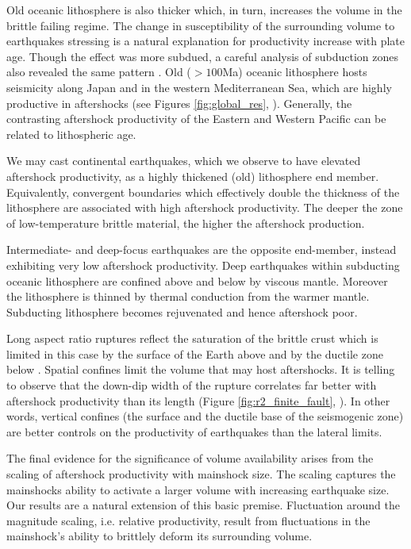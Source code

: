 \documentclass[draft, jgrga]{agujournal2018}
\begin{document}
Old oceanic lithosphere is also thicker which, in turn, increases the volume in the brittle failing regime. The change in susceptibility of the surrounding volume to earthquakes stressing is a natural explanation for productivity increase with plate age. Though the effect was more subdued, a careful analysis of subduction zones also revealed the same pattern \citep[Appendix of][]{Wetzler2016}. Old ($>100$Ma) oceanic lithosphere hosts seismicity along Japan and in the western Mediterranean Sea, which are highly productive in aftershocks (see Figures \ref{fig:global_res}, ). Generally, the contrasting aftershock productivity of the Eastern and Western Pacific can be related to lithospheric age. 

We may cast continental earthquakes, which we observe to have elevated aftershock productivity, as a highly thickened (old) lithosphere end member. Equivalently, convergent boundaries which effectively double the thickness of the lithosphere are associated with high aftershock productivity. The deeper the zone of low-temperature brittle material, the higher the aftershock production.

Intermediate- and deep-focus earthquakes are the opposite end-member, instead exhibiting very low aftershock productivity. Deep earthquakes within subducting oceanic lithosphere are confined above and below by viscous mantle. Moreover the lithosphere is thinned by thermal conduction from the warmer mantle. Subducting lithosphere becomes rejuvenated and hence aftershock poor.

Long aspect ratio ruptures reflect the saturation of the brittle crust which is limited in this case by the surface of the Earth above and by the ductile zone below \citep{Scholz2019}. Spatial confines limit the volume that may host aftershocks. It is telling to observe that the down-dip width of the rupture correlates far better with aftershock productivity than its length (Figure \ref{fig:r2_finite_fault}, ). In other words, vertical confines (the surface and the ductile base of the seismogenic zone) are better controls on the productivity of earthquakes than the lateral limits. 

The final evidence for the significance of volume availability arises from the scaling of aftershock productivity with mainshock size. The scaling captures the mainshocks ability to activate a larger volume with increasing earthquake size. Our results are a natural extension of this basic premise. Fluctuation around the magnitude scaling, i.e. relative productivity, result from fluctuations in the mainshock's ability to brittlely deform its surrounding volume. 
\end{document}
